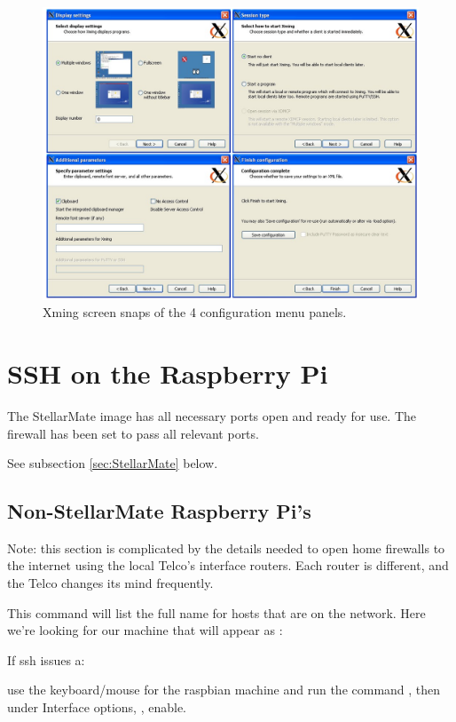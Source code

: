 \begin{figure}[h!]
\centering
\includegraphics[width=.75\textwidth]{images/XmingConfig.png}
\caption{Xming screen snaps of the 4 configuration menu panels.} %
\label{figure:XmingConfig}
\end{figure}


\newpage
\section{SSH on the Raspberry Pi}

The StellarMate image has all necessary ports open and ready for use.
The firewall has been set to pass all relevant ports.

See subsection \ref{sec:StellarMate} below.

\subsection{Non-StellarMate Raspberry Pi's}

Note: this section is complicated by the details needed to open
home firewalls to the internet using the local Telco's interface
routers. Each router is different, and the Telco changes its mind
frequently.

This command will list the full name for hosts that are on the network.
Here we're looking for our machine  that will appear
as :

{}

If ssh issues a:


use the keyboard/mouse for the raspbian machine and run the command
, then under Interface options,  , enable.


